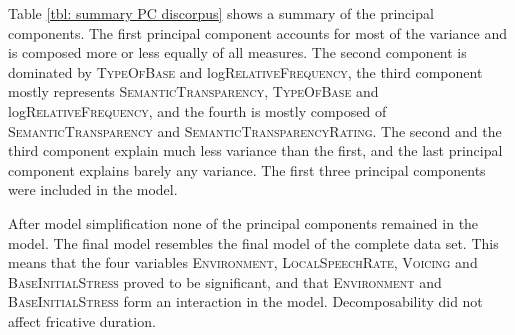Table \ref{tbl: summary PC discorpus} shows a summary of the principal components. The first principal component accounts for most of the variance and is composed more or less equally of all measures. The second component is dominated by \textsc{TypeOfBase} and log\textsc{RelativeFrequency}, the third component mostly represents \textsc{SemanticTransparency}, \textsc{TypeOfBase} and log\textsc{RelativeFrequency}, and the fourth is mostly composed of \textsc{SemanticTransparency} and \textsc{SemanticTransparencyRating}. The second and the third component explain much less variance than the first, and the last principal component explains barely any variance. The first three principal components were included in the model.


\clearpage
After model simplification none of the principal components remained in the model. The final model resembles the final model of the complete data set. This means that the four variables \textsc{Environment}, \textsc{LocalSpeechRate}, \textsc{Voicing} and \textsc{BaseInitialStress} proved to be significant, and that \textsc{Environment} and \textsc{BaseInitialStress} form an interaction in the model. Decomposability did not affect fricative duration. 


\begin{table}[t!]
	\caption{ Summary of principal components}
	\label{tbl: summary PC discorpus}
	\begin{center}
	\end{center}
\end{table}

